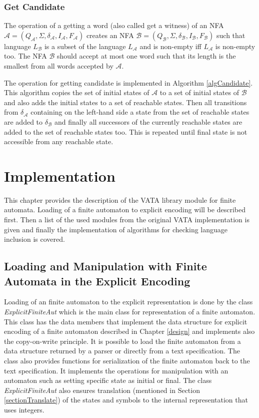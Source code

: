 \subsection{Get Candidate}
The operation of a getting a word (also called get a witness) of an NFA $\mathcal{A}=(Q_\mathcal{A},\Sigma,\delta_\mathcal{A},I_\mathcal{A},F_\mathcal{A})$ 
creates an NFA $\mathcal{B}=(Q_\mathcal{B},\Sigma,\delta_\mathcal{B},I_\mathcal{B},F_\mathcal{B})$ such that language $L_\mathcal{B}$
is a subset of the language $L_\mathcal{A}$ and is non-empty iff $L_\mathcal{A}$ is non-empty too.
The NFA $\mathcal{B}$ should accept at most one word such that its length is the smallest from all words accepted by $\mathcal{A}$.

The operation for getting candidate is implemented in Algorithm \ref{algCandidate}. This algorithm copies the set of initial states 
of $\mathcal{A}$ to a set of initial states of $\mathcal{B}$ and also adds the initial states to a set of reachable states. 
Then all transitions from $\delta_\mathcal{A}$ containing on the left-hand side a state from the set of reachable states are added to $\delta_\mathcal{B}$ 
and finally
all successors of the currently reachable states are added to the set of reachable states too. 
This is repeated until final state is not accessible from any reachable state. 

\chapter{Implementation}
\label{implementation}
This chapter provides the description of the VATA library module for finite automata. Loading of a finite
automaton to explicit encoding will be described first. 
Then a list of the used modules from the original VATA implementation is given and finally the implementation of algorithms 
for checking language inclusion is covered.

\section{Loading and Manipulation with Finite Automata in the Explicit Encoding}
Loading of an finite automaton to the explicit representation 
is done by  the class \emph{ExplicitFiniteAut} which is the main class for representation of a finite automaton. 
This class has the data members that implement the data structure for explicit encoding of a finite automaton described in Chapter \ref{design} and
implements also the copy-on-write principle. 
It is possible to load the finite automaton from a data structure returned by a parser or directly from a text specification. 
The class also provides functions for serialization of the finite automaton back to the text specification.
It implements the operations for manipulation with an automaton such as setting specific state as initial or final.
The class \emph{ExplicitFiniteAut} also ensures translation (mentioned in Section \ref{sectionTranslate}) of the states 
and symbols to the internal representation that uses integers. 

